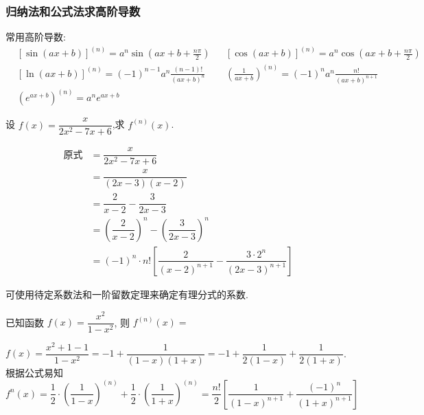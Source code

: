 \documentclass[8pt a4paper, oneside, UTF8]{ctexbook}  %
\begin{document}
\begin{sloppypar}
    \subsubsection{归纳法和公式法求高阶导数}
    常用高阶导数:
    $$
        \boxed{ \begin{aligned}
                 & \left[\sin(ax+b)\right]^{(n)}=a^{n}\sin\left(ax+b+\frac{n\pi}{2}\right) &  & \left[\cos(ax+b)\right]^{(n)}=a^{n}\cos\left(ax+b+\frac{n\pi}{2}\right) \\
                 & \left[\ln(ax+b)\right]^{(n)}=(-1)^{n-1}a^{n}\frac{(n-1)!}{(ax+b)^{n}}   &  & \left(\frac{1}{ax+b}\right)^{(n)}=(-1)^{n}a^{n}\frac{n!}{(ax+b)^{n+1}}  \\
                 & \left(e^{ax+b}\right)^{(n)}=a^{n}e^{ax+b}                               &  &
            \end{aligned}}
    $$
    \begin{problem}
    设 $f(x)=\dfrac x{2x^2-7x+6}$,求 $f^{(n)}(x)$.
    \end{problem}
    \begin{solution}
        \begin{align*}
            \text{原式} & = \dfrac{x}{2x^2-7x+6}                                                       \\
                      & =   \dfrac{x}{(2x-3)(x-2)}                                                   \\
                      & = \dfrac{2}{x-2}-\dfrac{3}{2x-3}                                             \\
                      & = (\dfrac{2}{x-2})^n-(\dfrac{3}{2x-3})^n                                     \\
                      & = (-1)^{n}\cdot n![\dfrac{2}{(x-2)^{n+1}}-\dfrac{3\cdot2^{n}}{(2x-3)^{n+1}}]
        \end{align*}
    \end{solution}
    \begin{note}
        可使用待定系数法和一阶留数定理来确定有理分式的系数.
    \end{note}
    \begin{problem}
    已知函数 $f(x)=\dfrac{x^2}{1-x^2}$, 则 $f^{(n)}(x)=$
    \end{problem}
    \begin{solution}
        $f(x)=\dfrac{x^2+1-1}{1-x^2}=-1+\dfrac{1}{(1-x)(1+x)}=-1+\dfrac{1}{2(1-x)}+\dfrac{1}{2(1+x)}$.
        根据公式易知$f^n(x)=\dfrac{1}{2}\cdot(\dfrac{1}{1-x})^{(n)}+\dfrac{1}{2}\cdot(\dfrac{1}{1+x})^{(n)}=\dfrac{n!}{2}[\dfrac{1}{(1-x)^{n+1}}+\dfrac{(-1)^{n}}{(1+x)^{n+1}}]$

\end{solution}
\end{sloppypar}
\end{document}
